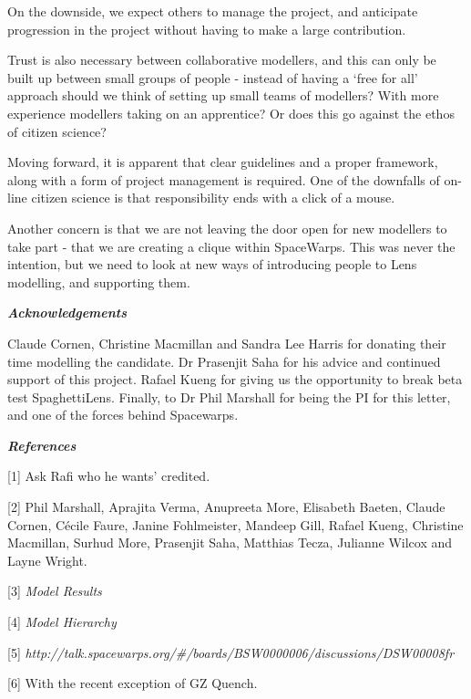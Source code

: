 \documentclass{article}
\begin{document}
\parindent=3pt
On the downside, we expect others to manage the project, and anticipate progression 
in the project without having to make a large contribution. 

\parindent=0pt
Trust is also necessary between collaborative modellers, and this can only be built 
up between small groups of people - instead of having a `free for all' approach 
should we think of setting up small teams of modellers? With more experience modellers 
taking on an apprentice? Or does this go against the ethos of citizen science? 

\parindent=3pt
Moving forward, it is apparent that clear guidelines and a proper framework, along 
with a form of project management is required. One of the downfalls of on-line 
citizen science is that responsibility ends with a click of a mouse. 

\parindent=0pt
Another concern is that we are not leaving the door open for new modellers to take 
part - that we are creating a clique within SpaceWarps. This was never the intention, 
but we need to look at new ways of introducing people to Lens modelling, and supporting 
them.

\textbf{\emph{Acknowledgements}}

Claude Cornen, Christine Macmillan and Sandra Lee Harris for donating their time 
modelling the candidate. Dr Prasenjit Saha for his advice and continued support 
of this project. Rafael Kueng for giving us the opportunity to break beta test 
SpaghettiLens. Finally, to Dr Phil Marshall for being the PI for this letter, and 
one of the forces behind Spacewarps.

\vspace{27pt}
{\small{}\textbf{\emph{References}}}

{\small{}[1] Ask Rafi who he wants' credited.}

{\small{}[2] Phil Marshall, Aprajita Verma, Anupreeta More, Elisabeth Baeten, Claude 
Cornen, Cécile Faure, Janine Fohlmeister, Mandeep Gill, Rafael Kueng, Christine 
Macmillan, Surhud More, Prasenjit Saha, Matthias Tecza, Julianne Wilcox and Layne 
Wright.}

{\small{}[3] }{\small{}{\color{color02} \emph{Model Results}}}

{\small{}[4] }{\small{}{\color{color02} \emph{Model Hierarchy}}}

{\small{}[5] }{\small{}{\color{color02} \emph{http://talk.spacewarps.org/\#/boards/BSW0000006/discussions/DSW00008fr}}}

{\small{}[6] With the recent exception \label{HGoBack}of GZ Quench.}

\newpage
\end{document}
